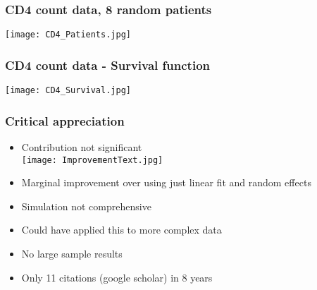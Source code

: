 \documentclass[10pt,dvipsnames,table, handout]{beamer} %
\begin{document}
\begin{frame}
\frametitle{CD4 count data, 8 random patients}
\begin{center}
\texttt{[image: CD4\_Patients.jpg]} \\
\end{center}
\end{frame}

\begin{frame}
\frametitle{CD4 count data - Survival function}
\begin{center}
\texttt{[image: CD4\_Survival.jpg]} \\
\end{center}
\end{frame}

\begin{frame}
\frametitle{Critical appreciation}
\begin{itemize}
\item Contribution not significant \\
\pause
\texttt{[image: ImprovementText.jpg]} \\
\pause \item Marginal improvement over using just linear fit and random effects
\pause \item Simulation not comprehensive
\pause \item Could have applied this to more complex data
\pause \item No large sample results
\pause \item Only 11 citations (google scholar) in 8 years
\end{itemize}
\end{frame}
\end{document}
